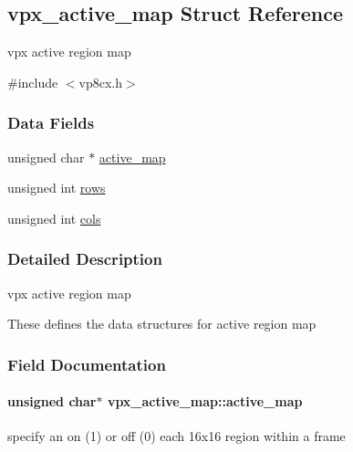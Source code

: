 \hypertarget{structvpx__active__map}{}\subsection{vpx\+\_\+active\+\_\+map Struct Reference}
\label{structvpx__active__map}


vpx active region map  




{\ttfamily \#include $<$vp8cx.\+h$>$}

\subsubsection*{Data Fields}
\begin{DoxyCompactItemize}
\item 
unsigned char $\ast$ \hyperlink{structvpx__active__map_a6e5e092e766ae3f65d280c68c9f6df82}{active\+\_\+map}
\item 
unsigned int \hyperlink{structvpx__active__map_a29424c92ff201f97db9bf62d16dfab4d}{rows}
\item 
unsigned int \hyperlink{structvpx__active__map_a310edb5efc62d596b2c276e3f7d1b42a}{cols}
\end{DoxyCompactItemize}


\subsubsection{Detailed Description}
vpx active region map 

These defines the data structures for active region map 

\subsubsection{Field Documentation}
\paragraph[{\texorpdfstring{active\+\_\+map}{active_map}}]{\setlength{\rightskip}{0pt plus 5cm}unsigned char$\ast$ vpx\+\_\+active\+\_\+map\+::active\+\_\+map}\hypertarget{structvpx__active__map_a6e5e092e766ae3f65d280c68c9f6df82}{}\label{structvpx__active__map_a6e5e092e766ae3f65d280c68c9f6df82}
specify an on (1) or off (0) each 16x16 region within a frame 
